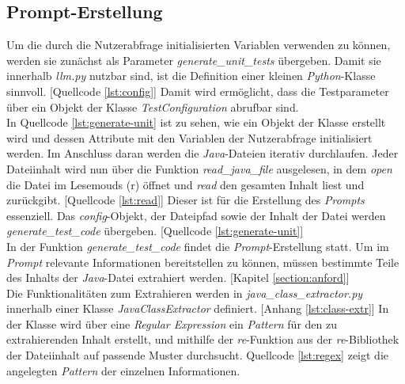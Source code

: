 \subsection{Prompt-Erstellung}
Um die durch die Nutzerabfrage initialisierten Variablen verwenden zu können, werden sie zunächst als Parameter \textit{generate\_unit\_tests} übergeben. Damit sie innerhalb \textit{llm.py} nutzbar sind, ist die Definition einer kleinen \textit{Python}-Klasse sinnvoll. [Quellcode \ref{lst:config}] Damit wird ermöglicht, dass die Testparameter über ein Objekt der Klasse \textit{TestConfiguration} abrufbar sind.\\
\vspace{-.3cm}
In Quellcode \ref{lst:generate-unit} ist zu sehen, wie ein Objekt der Klasse erstellt wird und dessen Attribute mit den Variablen der Nutzerabfrage initialisiert werden. Im Anschluss daran werden die \textit{Java}-Dateien iterativ durchlaufen. Jeder Dateiinhalt wird nun über die Funktion \textit{read\_java\_file} ausgelesen, in dem \textit{open} die Datei im Lesemouds (r) öffnet und \textit{read} den gesamten Inhalt liest und zurückgibt. [Quellcode \ref{lst:read}] Dieser ist für die Erstellung des \textit{Prompts} essenziell. Das \textit{config}-Objekt, der Dateipfad sowie der Inhalt der Datei werden \textit{generate\_test\_code} übergeben. [Quellcode \ref{lst:generate-unit}]\\
\vspace{0.5cm}
\vspace{-.3cm}
In der Funktion \textit{generate\_test\_code} findet die \textit{Prompt}-Erstellung statt. Um im \textit{Prompt} relevante Informationen bereitstellen zu können, müssen bestimmte Teile des Inhalts der \textit{Java}-Datei extrahiert werden. [Kapitel \ref{section:anford}]\\ Die Funktionalitäten zum Extrahieren werden in \textit{java\_class\_extractor.py} innerhalb einer Klasse \textit{JavaClassExtractor} definiert. [Anhang \ref{lst:class-extr}] In der Klasse wird über eine \textit{Regular Expression} ein \textit{Pattern} für den zu extrahierenden Inhalt erstellt, und mithilfe der \textit{re}-Funktion aus der \textit{re}-Bibliothek der Dateiinhalt auf passende Muster durchsucht. Quellcode \ref{lst:regex} zeigt die angelegten \textit{Pattern} der einzelnen Informationen.\\
